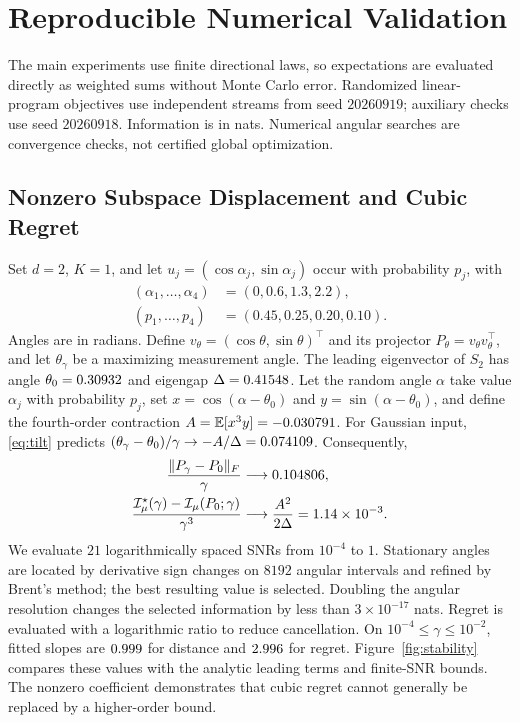 \section{Reproducible Numerical Validation}
The main experiments use finite directional laws, so expectations are evaluated directly as weighted sums without Monte Carlo error. Randomized linear-program objectives use independent streams from seed $20260919$; auxiliary checks use seed $20260918$. Information is in nats. Numerical angular searches are convergence checks, not certified global optimization.

\subsection{Nonzero Subspace Displacement and Cubic Regret}
Set $d=2$, $K=1$, and let $u_j=(\cos\alpha_j,\sin\alpha_j)$ occur with probability $p_j$, with
\begin{equation}
\begin{aligned}
(\alpha_1,\ldots,\alpha_4)&=(0,0.6,1.3,2.2),\\
(p_1,\ldots,p_4)&=(0.45,0.25,0.20,0.10).
\end{aligned}
\end{equation}
Angles are in radians. Define $v_\theta=(\cos\theta,\sin\theta)^{\top}$ and its projector $P_\theta=v_\theta v_\theta^{\top}$, and let $\theta_\gamma$ be a maximizing measurement angle. The leading eigenvector of $S_2$ has angle $\theta_0=0.30932$ and eigengap $\Delta=0.41548$. Let the random angle $\alpha$ take value $\alpha_j$ with probability $p_j$, set $x=\cos(\alpha-\theta_0)$ and $y=\sin(\alpha-\theta_0)$, and define the fourth-order contraction $A=\mathbb E[x^3y]=-0.030791$. For Gaussian input, \eqref{eq:tilt} predicts $(\theta_\gamma-\theta_0)/\gamma\to-A/\Delta=0.074109$. Consequently,
\begin{align}
\frac{\|P_\gamma-P_0\|_F}{\gamma}&\longrightarrow0.104806,\\
\frac{\mathcal I_\mu^\star(\gamma)-\mathcal I_\mu(P_0;\gamma)}{\gamma^3}
&\longrightarrow\frac{A^2}{2\Delta}=1.14\times10^{-3}.
\end{align}
We evaluate $21$ logarithmically spaced SNRs from $10^{-4}$ to $1$. Stationary angles are located by derivative sign changes on $8192$ angular intervals and refined by Brent's method; the best resulting value is selected. Doubling the angular resolution changes the selected information by less than $3\times10^{-17}$ nats. Regret is evaluated with a logarithmic ratio to reduce cancellation. On $10^{-4}\le\gamma\le10^{-2}$, fitted slopes are $0.999$ for distance and $2.996$ for regret. Figure~\ref{fig:stability} compares these values with the analytic leading terms and finite-SNR bounds. The nonzero coefficient demonstrates that cubic regret cannot generally be replaced by a higher-order bound.
